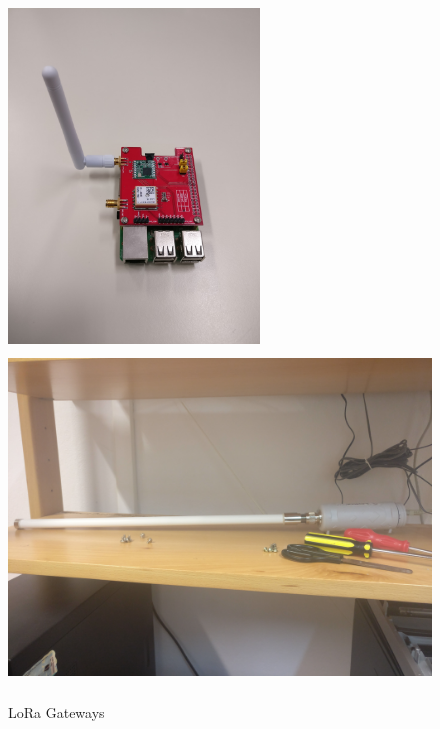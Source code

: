 \begin{figure}[htbp]
  \centering
    {\includegraphics[height=3.5in,width=0.5\linewidth]{Chapters/Figures/rpi.jpg}}%
    {\includegraphics[height=3.5in,width=0.5\linewidth]{Chapters/Figures/Lorix.jpg}}%
  \caption{LoRa Gateways}
  \label{fig:LoRaGWs}
\end{figure}




